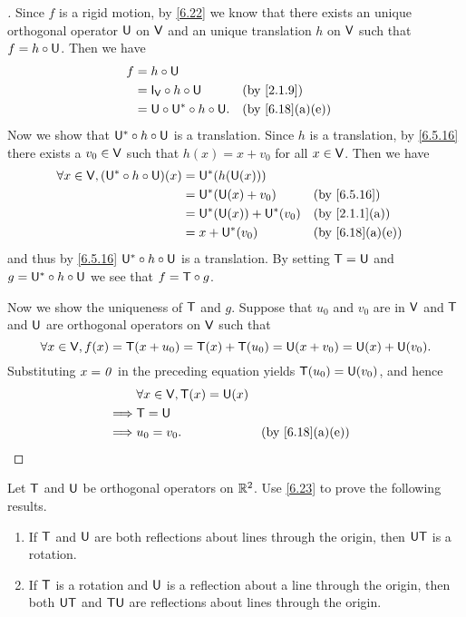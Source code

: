 \begin{proof}[]
  Since \(f\) is a rigid motion, by \cref{6.22} we know that there exists an unique orthogonal operator \(\mathsf{U}\) on \(\mathsf{V}\) and an unique translation \(h\) on \(\mathsf{V}\) such that \(f = h \circ \mathsf{U}\).
  Then we have
  \begin{align*}
    f & = h \circ \U                                          \\
      & = \IT[\V] \circ h \circ \U        &  & \by{2.1.9}     \\
      & = \U \circ \U^* \circ h \circ \U. &  & \by{6.18}[a,e]
  \end{align*}
  Now we show that \(\mathsf{U}^* \circ h \circ \mathsf{U}\) is a translation.
  Since \(h\) is a translation, by \cref{6.5.16} there exists a \(v_0 \in \mathsf{V}\) such that \(h(x) = x + v_0\) for all \(x \in \mathsf{V}\).
  Then we have
  \begin{align*}
    \forall x \in \V, (\U^* \circ h \circ \U)(x) & = \U^*(h(\U(x)))                              \\
                                                 & = \U^*(\U(x) + v_0)       &  & \by{6.5.16}    \\
                                                 & = \U^*(\U(x)) + \U^*(v_0) &  & \by{2.1.1}[a]  \\
                                                 & = x + \U^*(v_0)           &  & \by{6.18}[a,e]
  \end{align*}
  and thus by \cref{6.5.16} \(\mathsf{U}^* \circ h \circ \mathsf{U}\) is a translation.
  By setting \(\mathsf{T} = \mathsf{U}\) and \(g = \mathsf{U}^* \circ h \circ \mathsf{U}\) we see that \(f = \mathsf{T} \circ g\).

  Now we show the uniqueness of \(\mathsf{T}\) and \(g\).
  Suppose that \(u_0\) and \(v_0\) are in \(\mathsf{V}\) and \(\mathsf{T}\) and \(\mathsf{U}\) are orthogonal operators on \(\mathsf{V}\) such that
  \[
    \forall x \in \mathsf{V}, f(x) = \mathsf{T}(x + u_0) = \mathsf{T}(x) + \mathsf{T}(u_0) = \mathsf{U}(x + v_0) = \mathsf{U}(x) + \mathsf{U}(v_0).
  \]
  Substituting \(x = \mathit{0}\) in the preceding equation yields \(\mathsf{T}(u_0) = \mathsf{U}(v_0)\), and hence
  \begin{align*}
             & \forall x \in \V, \T(x) = \U(x)                     \\
    \implies & \T = \U                                             \\
    \implies & u_0 = v_0.                      &  & \by{6.18}[a,e]
  \end{align*}
\end{proof}

\begin{ex}\label{ex:6.5.24}
  Let \(\mathsf{T}\) and \(\mathsf{U}\) be orthogonal operators on \(\mathbb{R}^2\).
  Use \cref{6.23} to prove the following results.
  \begin{enumerate}
    \item If \(\mathsf{T}\) and \(\mathsf{U}\) are both reflections about lines through the origin, then \(\mathsf{U} \mathsf{T}\) is a rotation.
    \item If \(\mathsf{T}\) is a rotation and \(\mathsf{U}\) is a reflection about a line through the origin, then both \(\mathsf{U} \mathsf{T}\) and \(\mathsf{T} \mathsf{U}\) are reflections about lines through the origin.
  \end{enumerate}
\end{ex}

